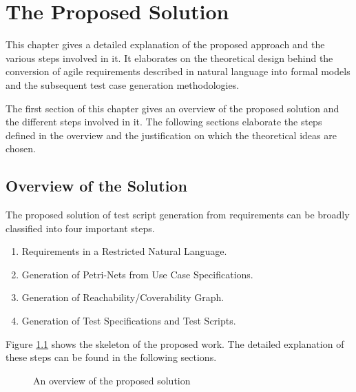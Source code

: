 \chapter{The Proposed Solution}\label{proposedsolution} 
This chapter gives a detailed explanation of the proposed approach and the various steps involved in it. It elaborates on the theoretical design behind the conversion of agile requirements described in natural language into formal models and the subsequent test case generation methodologies.
 
The first section of this chapter gives an overview of the proposed solution and the different steps involved in it. The following sections elaborate the steps defined in the overview and the justification on which the theoretical ideas are chosen.


\section{Overview of the Solution}
The proposed solution of test script generation from requirements can be broadly classified into four important steps.
\begin{enumerate}
\item Requirements in a Restricted Natural Language.
\item Generation of Petri-Nets from Use Case Specifications.
\item Generation of Reachability/Coverability Graph.
\item Generation of Test Specifications and Test Scripts.
\end{enumerate}
Figure \ref{fig:proposed_solution2} shows the skeleton of the proposed work. The detailed explanation of these steps can be found in the following sections.

\begin{figure}[]
\centering
{}
\caption{An overview of the proposed solution}
\label{fig:proposed_solution2}
\end{figure}


